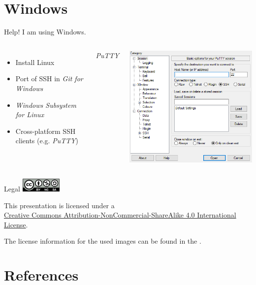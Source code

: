 \documentclass[10pt, graphics, aspectratio=169, table]{beamer}
\begin{document}
\section{Windows}
\begin{frame}[fragile]{Help! I am using Windows.}
	\begin{columns}
		\begin{itemize}
			\item Install Linux
			\item Port of SSH in \emph{Git for Windows}
			\item \emph{Windows Subsystem for Linux}
			\item Cross-platform SSH clients (e.g. \emph{PuTTY})
		\end{itemize}
		\centering
		\emph{PuTTY} \cite{putty}

		\includegraphics[height=0.65\paperheight]{img/putty.png}
	\end{columns}
\end{frame}

\maketitle

\begin{frame}{Legal}
\centering
\includegraphics[width=0.15\textwidth]{../license.png}

This presentation is licensed under a\\
\href{https://creativecommons.org/licenses/by-nc-sa/4.0/}{Creative Commons Attribution-NonCommercial-ShareAlike 4.0 International License}.

The license information for the used images can be found in the .
\end{frame}

\section{References} \label{references}
\begin{frame}[allowframebreaks]
	\printbibliography[heading=none]
\end{frame}
\end{document}

